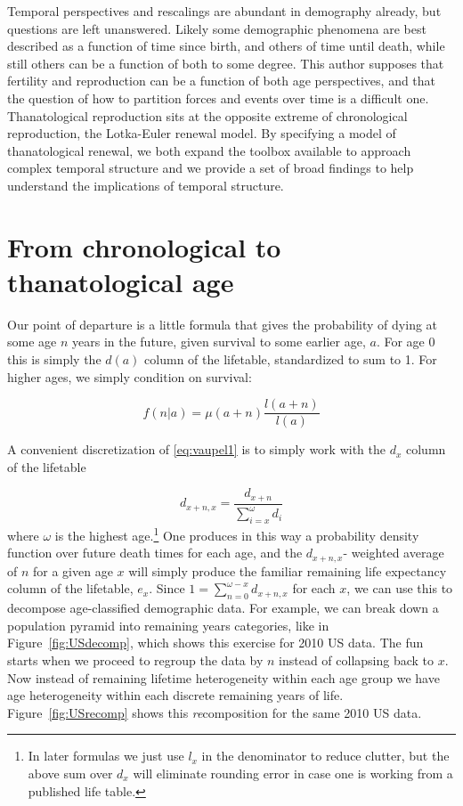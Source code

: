 \documentclass{article}
\begin{document}
Temporal perspectives and rescalings are abundant in demography already,
but questions are left unanswered. Likely some demographic phenomena are best
described as a function of time since birth, and others of time until death,
while still others can be a function of both to some degree. This author
supposes that fertility and reproduction can be a function of both age
perspectives, and that the question of how to partition forces and events over
time is a difficult one. Thanatological reproduction sits at the opposite
extreme of chronological reproduction, the Lotka-Euler renewal
model. By specifying a model of thanatological renewal, we both expand the
toolbox available to approach complex temporal structure and we provide a set of broad
findings to help understand the implications of temporal structure. 

\section*{From chronological to thanatological age}

Our point of departure is a little formula that gives the probability of
dying at some age $n$ years in the future, given survival to some
earlier age, $a$. For age 0 this is simply the $d(a)$ column of the lifetable,
standardized to sum to 1. For higher ages, we simply condition on survival:

\begin{equation}
\label{eq:vaupel1}
f(n | a) = \mu(a+n)\frac{l(a+n)}{l(a)}
\end{equation}

A convenient discretization of \eqref{eq:vaupel1} is to simply work with the
$d_x$ column of the lifetable

\begin{equation}
d_{x+n, x} = \frac{d_{x+n}}{\sum_{i=x}^\omega d_i }
\end{equation}
where $\omega$ is the highest age.\footnote{In later formulas we just use $l_x$
in the denominator to reduce clutter, but the above sum over $d_x$ will eliminate
rounding error in case one is working from a published life table.} One
produces in this way a probability density function over future death times for each age, and the $d_{x+n, x}$- weighted average of $n$ for a given age $x$ will simply produce the familiar remaining life expectancy column of the lifetable, $e_x$. Since $1 = \sum_{n=0}^{\omega - x}d_{x+n, x}$ for each $x$, we can use this to
decompose age-classified demographic data. For example, we can break down a
population pyramid into remaining years categories, like in
Figure~\ref{fig:USdecomp}, which shows this exercise for 2010 US data. The fun starts when we proceed to regroup
the data by $n$ instead of collapsing back to $x$. Now instead of remaining lifetime 
heterogeneity within each age group we have age heterogeneity within each
discrete remaining years of life. Figure~\ref{fig:USrecomp} shows this
\textit{re}composition for the same 2010 US data.
\end{document}
